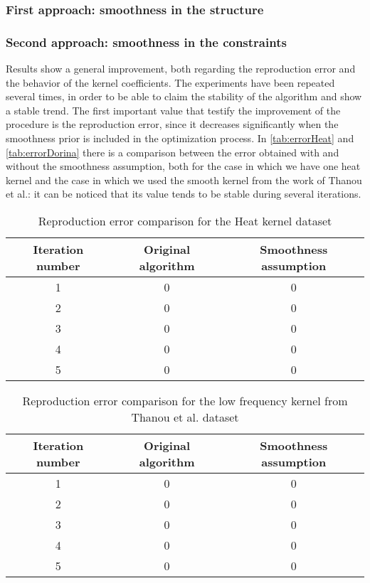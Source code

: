 \subsubsection{First approach: smoothness in the structure}

\subsubsection{Second approach: smoothness in the constraints}
Results show a general improvement, both regarding the reproduction error and the behavior of the kernel coefficients. The experiments have been repeated several times, in order to be able to claim the stability of the algorithm and show a stable trend. The first important value that testify the improvement of the procedure is the reproduction error, since it decreases significantly when the smoothness prior is included in the optimization process. In \autoref{tab:errorHeat} and \autoref{tab:errorDorina} there is a comparison between the error obtained with and without the smoothness assumption, both for the case in which we have one heat kernel and the case in which we used the smooth kernel from the work of Thanou et al.: it can be noticed that its value tends to be stable during several iterations.

\begin{table}[htbp]
  \centering
  \begin{tabular}{c|c|c}
    \multicolumn{1}{c|}{\textbf{Iteration number}} &
    \multicolumn{1}{c}{\textbf{Original algorithm}} &
    \multicolumn{1}{|c}{\textbf{Smoothness assumption}}\\
    \hline
    1 & 0 & 0\\
    2 & 0 & 0\\
    3 & 0 & 0\\
    4 & 0 & 0\\
    5 & 0 & 0\\
  \end{tabular}
  \caption{Reproduction error comparison for the Heat kernel dataset}
  \label{tab:errorHeat}
\end{table}

\begin{table}[htbp]
  \centering
  \begin{tabular}{c|c|c}
    \multicolumn{1}{c|}{\textbf{Iteration number}} &
    \multicolumn{1}{c}{\textbf{Original algorithm}} &
    \multicolumn{1}{|c}{\textbf{Smoothness assumption}}\\
    \hline
    1 & 0 & 0\\
    2 & 0 & 0\\
    3 & 0 & 0\\
    4 & 0 & 0\\
    5 & 0 & 0\\
  \end{tabular}
  \caption{Reproduction error comparison for the low frequency kernel from Thanou et al. dataset}
  \label{tab:errorDorina}
\end{table}

